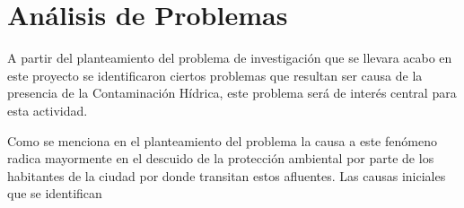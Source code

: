 \section{Análisis de Problemas}
    
    A partir del planteamiento del problema de investigación que se llevara acabo en este proyecto se identificaron ciertos problemas que resultan ser causa de la presencia de la Contaminación Hídrica, este problema será de interés central para esta actividad.

    Como se menciona en el planteamiento del problema la causa a este fenómeno radica mayormente en el descuido de la protección ambiental por parte de los habitantes de la ciudad por donde transitan estos afluentes. Las causas iniciales que se identifican 

